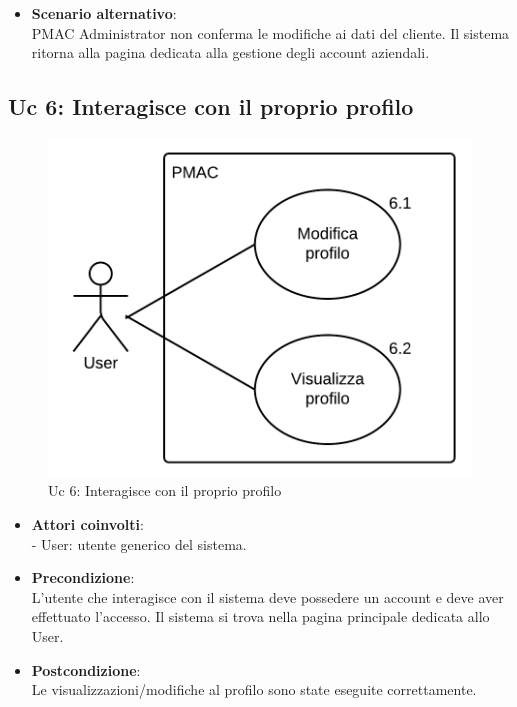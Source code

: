 {\begin{itemize}
\item \textbf{Scenario alternativo}:\\
PMAC Administrator non conferma le modifiche ai dati del cliente. Il sistema ritorna alla pagina dedicata alla gestione degli account aziendali.

\end{itemize}


\subsection{Uc 6: Interagisce con il proprio profilo}
\begin{figure}[ht]
\centering
\caption{Uc 6: Interagisce con il proprio profilo}
\includegraphics[scale=0.9]{images/cap1/UseCase/Uc6} %
\end{figure}

\begin{itemize}
\item \textbf{Attori coinvolti}:\\
- User: utente generico del sistema.

\item \textbf{Precondizione}:\\
L'utente che interagisce con il sistema deve possedere un account e deve aver effettuato l'accesso. Il sistema si trova nella pagina principale dedicata allo User.

\item \textbf{Postcondizione}:\\
Le visualizzazioni/modifiche al profilo sono state eseguite correttamente. 


\end{itemize}}
